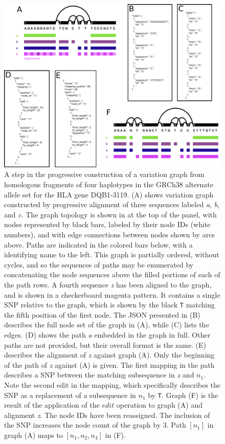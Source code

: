 \begin{figure}[htbp!]
  \includegraphics[width=\textwidth]{Chapter2/Figs/example_vg_construction.pdf}
  \caption[The basic elements of a variation graph]{
    A step in the progressive construction of a variation graph from homologous fragments of four haplotypes in the GRCh38 alternate allele set for the HLA gene DQB1-3119.
    (A) shows variation graph constructed by progressive alignment of three sequences labeled \emph{a}, \emph{b}, and \emph{c}.
    The graph topology is shown in at the top of the panel, with nodes represented by black bars, labeled by their node IDs (white numbers), and with edge connections between nodes shown by arcs above.
    Paths are indicated in the colored bars below, with a identifying name to the left.
    This graph is partially ordered, without cycles, and so the sequences of paths may be enumerated by concatenating the node sequences above the filled portions of each of the path rows.
    A fourth sequence \emph{z} has been aligned to the graph, and is shown in a checkerboard magenta pattern.
    It contains a single SNP relative to the graph, which is shown by the black {\tt T} matching the fifth position of the first node.
    The JSON presented in (B) describes the full node set of the graph in (A), while (C) lists the edges.
    (D) shows the path \emph{a} embedded in the graph in full. Other paths are not provided, but their overall format is the same.
    (E) describes the alignment of \emph{z} against graph (A). Only the beginning of the path of \emph{z} against (A) is given.
    The first mapping in the path describes a SNP between the matching subsequence in \emph{z} and $n_1$.
    Note the second edit in the mapping, which specifically describes the SNP as a replacement of a subsequence in $n_1$ by {\tt T}.
    Graph (F) is the result of the application of the $edit$ operation to graph (A) and alignment \emph{z}.
    The node IDs have been reassigned.
    The inclusion of the SNP increases the node count of the graph by 3.
    Path $[n_1]$ in graph (A) maps to $[n_1,n_2,n_4]$ in (F).
  }
  \label{fig:vg_illustrative_example}
\end{figure}

